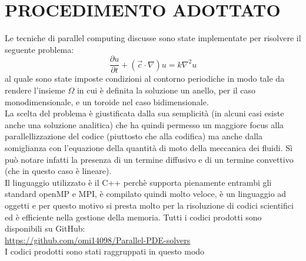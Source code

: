 \documentclass[italian]{article}
\begin{document}
\section{PROCEDIMENTO ADOTTATO}
Le tecniche di parallel computing discusse sono state implementate per risolvere il seguente problema:
\begin{equation*}
\frac{\partial u}{\partial t} + (\vec{c} \cdot \nabla)u = k \nabla ^ 2 u    
\end{equation*}
al quale sono state imposte condizioni al contorno periodiche in modo tale da rendere l'insieme $\Omega$ in cui è definita la soluzione un anello, per il caso monodimensionale, e un toroide nel caso bidimensionale.\\
La scelta del problema è giustificata dalla sua semplicità (in alcuni casi esiste anche una soluzione analitica) che ha quindi permesso un maggiore focus alla parallellizzazione del codice (piuttosto che alla codifica) ma anche dalla somiglianza con l'equazione della quantità di moto della meccanica dei fluidi. Sì può notare infatti la presenza di un termine diffusivo e di un termine convettivo (che in questo caso è lineare).\\
Il linguaggio utilizzato è il C++ perchè supporta pienamente entrambi gli standard openMP e MPI, è compilato quindi molto veloce, è un linguaggio ad oggetti e per questo motivo si presta molto per la risoluzione di codici scientifici ed è efficiente nella gestione della memoria. Tutti i codici prodotti sono disponibili su GitHub:\\
\url{https://github.com/omi14098/Parallel-PDE-solvers}\\
I codici prodotti sono stati raggruppati in questo modo
\end{document}

